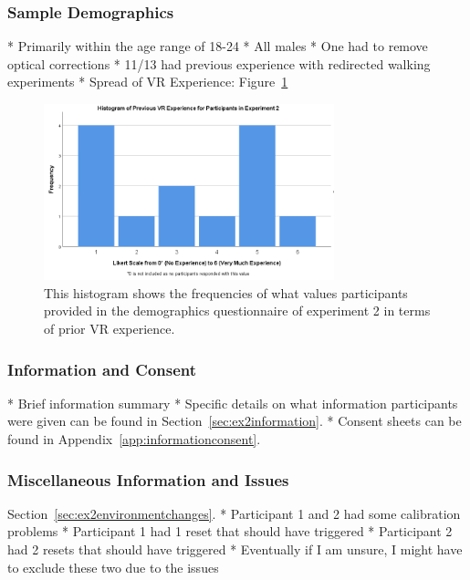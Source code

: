 \subsubsection{Sample Demographics}

* Primarily within the age range of 18-24
* All males
* One had to remove optical corrections
* 11/13 had previous experience with redirected walking experiments
* Spread of VR Experience: Figure~\ref{fig:ex2PriorVRExperience}

\begin{figure}[tbph]
    \centering
    \includegraphics[width=0.75\textwidth]{figures/graphs/PriorVRExperienceExperiment2.png}
    \caption[Histogram on Prior VR Experience of Participants in Experiment 2]{This histogram shows the frequencies of what values participants provided in the demographics questionnaire of experiment 2 in terms of prior VR experience.}
    \label{fig:ex2PriorVRExperience}
\end{figure}

\subsubsection{Information and Consent}
* Brief information summary
* Specific details on what information participants were given can be found in Section~\ref{sec:ex2information}.
* Consent sheets can be found in Appendix~\ref{app:informationconsent}.


\subsubsection{Miscellaneous Information and Issues}
Section~\ref{sec:ex2environmentchanges}.
   * Participant 1 and 2 had some calibration problems
      * Participant 1 had 1 reset that should have triggered
      * Participant 2 had 2 resets that should have triggered
      * Eventually if I am unsure, I might have to exclude these two due to the issues
      
